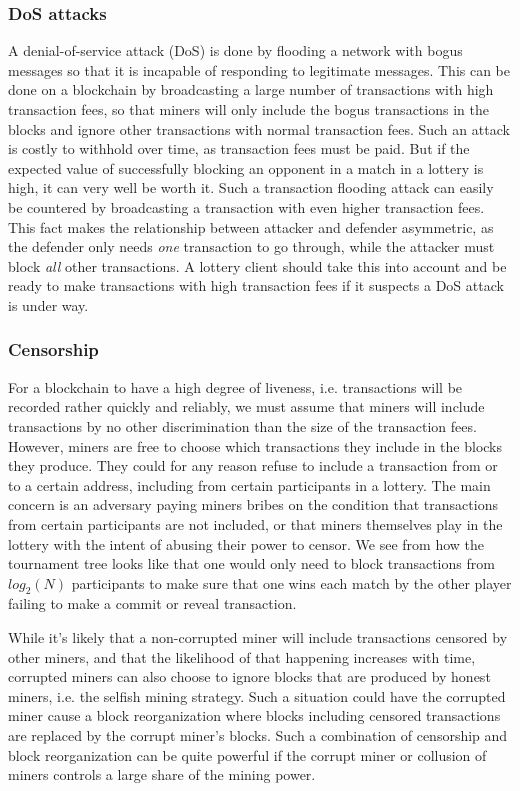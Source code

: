 \subsubsection{DoS attacks}
A denial-of-service attack (DoS) is done by flooding a network with bogus messages so that it is incapable of responding to legitimate messages. This can be done on a blockchain by broadcasting a large number of transactions with high transaction fees, so that miners will only include the bogus transactions in the blocks and ignore other transactions with normal transaction fees. Such an attack is costly to withhold over time, as transaction fees must be paid. But if the expected value of successfully blocking an opponent in a match in a lottery is high, it can very well be worth it. Such a transaction flooding attack can easily be countered by broadcasting a transaction with even higher transaction fees. This fact makes the relationship between attacker and defender asymmetric, as the defender only needs \emph{one} transaction to go through, while the attacker must block \emph{all} other transactions. A lottery client should take this into account and be ready to make transactions with high transaction fees if it suspects a DoS attack is under way.

\subsubsection{Censorship}
For a blockchain to have a high degree of liveness, i.e. transactions will be recorded rather quickly and reliably, we must assume that miners will include transactions by no other discrimination than the size of the transaction fees. However, miners are free to choose which transactions they include in the blocks they produce. They could for any reason refuse to include a transaction from or to a certain address, including from certain participants in a lottery. The main concern is an adversary paying miners bribes on the condition that transactions from certain participants are not included, or that miners themselves play in the lottery with the intent of abusing their power to censor. We see from how the tournament tree looks like that one would only need to block transactions from $log_2(N)$ participants to make sure that one wins each match by the other player failing to make a commit or reveal transaction. 

While it's likely that a non-corrupted miner will include transactions censored by other miners, and that the likelihood of that happening increases with time, corrupted miners can also choose to ignore blocks that are produced by honest miners, i.e. the selfish mining strategy. Such a situation could have the corrupted miner cause a block reorganization where blocks including censored transactions are replaced by the corrupt miner's blocks. Such a combination of censorship and block reorganization can be quite powerful if the corrupt miner or collusion of miners controls a large share of the mining power.

